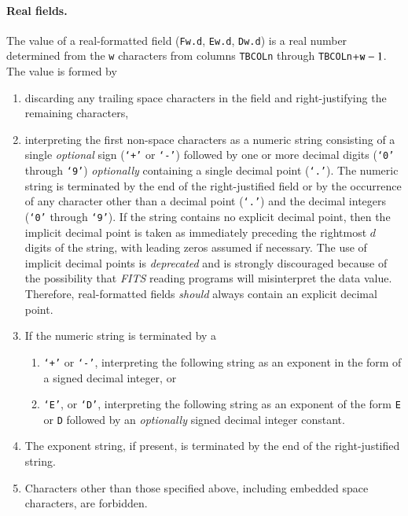 \documentclass[onecolumn]{aa}
\begin{document}
   \paragraph{Real fields.} The value of a real-formatted field ({\tt F}{\tt w.d\/}, 
   {\tt E}{\tt w.d\/}, {\tt D}{\tt w.d\/}) is a real number determined
   from the {\tt w}  characters from columns {\tt TBCOL}{\tt n\/} through 
   {\tt TBCOL}{\tt n}$ + {\tt w} - 1$.  The value is formed by 
   \begin{enumerate}
       \item discarding any trailing space characters in the field and right-justifying
         the remaining characters,
       \item interpreting the first non-space characters as a numeric
           string consisting of a single {\em optional} sign ({\tt `+'} or
           {\tt `-'}) followed by one or more decimal digits 
           ({\tt `0'} through {\tt `9'}) {\em optionally} containing 
           a single decimal point ({\tt `.'}).  The numeric string 
           is terminated by the end of the right-justified field or 
           by the occurrence of any character other than a decimal 
           point ({\tt `.'}) and the decimal integers ({\tt `0'} 
           through {\tt `9'}).  If
           the string contains no explicit decimal point, then the
           implicit decimal point is taken as immediately preceding 
           the rightmost $d$ digits of the string, with 
           leading zeros assumed if necessary.  The use of implicit
	   decimal points is {\em deprecated} 
	   and is strongly discouraged
	   because of the possibility that {\em FITS\/} reading programs will
	   misinterpret the data value.
	   Therefore, real-formatted fields {\em should} always contain an 
	   explicit decimal point.
       \item If the numeric string is terminated by a
        \begin{enumerate}
         \item {\tt `+'} or {\tt `-'}, interpreting the following
               string as an exponent in the form of a signed decimal
               integer, or
         \item {\tt `E'}, or {\tt `D'}, interpreting the following
               string as an exponent of the form {\tt E} or {\tt D}
               followed by an {\em optionally} signed decimal integer
               constant.
        \end{enumerate}
       \item The exponent string, if present, is terminated by 
           the end of the right-justified string.
       \item Characters other than those specified above, including embedded space
       characters, are forbidden.
   \end{enumerate}
\end{document}
